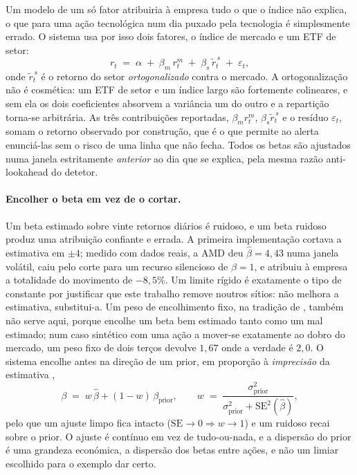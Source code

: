 Um modelo de um só fator atribuiria à empresa tudo o que o índice não explica, o que para uma ação
tecnológica num dia puxado pela tecnologia é simplesmente errado. O sistema usa por isso dois fatores,
o índice de mercado e um ETF de setor:
\begin{equation}
r_t \;=\; \alpha \;+\; \beta_m\,r^{m}_t \;+\; \beta_s\,\tilde r^{\,s}_t \;+\; \varepsilon_t ,
\label{eq:decomp}
\end{equation}
onde $\tilde r^{\,s}_t$ é o retorno do setor \emph{ortogonalizado} contra o mercado. A ortogonalização
não é cosmética: um ETF de setor e um índice largo são fortemente colineares, e sem ela os dois
coeficientes absorvem a variância um do outro e a repartição torna-se arbitrária. As três
contribuições reportadas, $\beta_m r^{m}_t$, $\beta_s \tilde r^{\,s}_t$ e o resíduo $\varepsilon_t$,
somam o retorno observado por construção, que é o que permite ao alerta enunciá-las sem o risco de uma
linha que não fecha. Todos os betas são ajustados numa janela estritamente \emph{anterior} ao dia que
se explica, pela mesma razão anti-lookahead do detetor.

\paragraph{Encolher o beta em vez de o cortar.} Um beta estimado sobre vinte retornos diários é
ruidoso, e um beta ruidoso produz uma atribuição confiante e errada. A primeira implementação cortava
a estimativa em $\pm 4$; medido com dados reais, a AMD deu $\hat\beta = 4,43$ numa janela volátil,
caiu pelo corte para um recurso silencioso de $\beta = 1$, e atribuiu à empresa a totalidade do
movimento de $-8,5\%$. Um limite rígido é exatamente o tipo de constante por justificar que este
trabalho remove noutros sítios: não melhora a estimativa, substitui-a. Um peso de encolhimento fixo,
na tradição de \textcite{blume1971risk}, também não serve aqui, porque encolhe um beta bem estimado
tanto como um mal estimado; num caso sintético com uma ação a mover-se exatamente ao dobro do mercado,
um peso fixo de dois terços devolve $1,67$ onde a verdade é $2,0$. O sistema encolhe antes na direção
de um prior, em proporção à \emph{imprecisão} da estimativa \autocite{vasicek1973beta},
\begin{equation}
\beta \;=\; w\,\hat\beta + (1-w)\,\beta_{\text{prior}},
\qquad
w \;=\; \frac{\sigma^2_{\text{prior}}}{\sigma^2_{\text{prior}} + \mathrm{SE}^2(\hat\beta)} ,
\label{eq:vasicek}
\end{equation}
pelo que um ajuste limpo fica intacto ($\mathrm{SE}\!\to\!0 \Rightarrow w\!\to\!1$) e um ruidoso recai
sobre o prior. O ajuste é contínuo em vez de tudo-ou-nada, e a dispersão do prior é uma grandeza
económica, a dispersão dos betas entre ações, e não um limiar escolhido para o exemplo dar certo.

